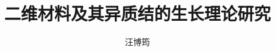 \documentclass[doctor]{thesis-uestc}
\title{二维材料及其异质结的生长理论研究}{Growth mechanism of two-dimensional
materials and heterostructure}
\author{汪博筠}{Wang Bojun}
\begin{document}
\makecover




\tableofcontents



\end{document}
